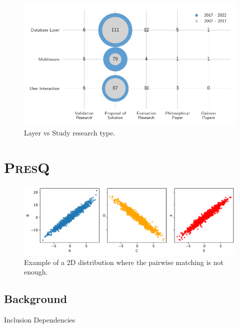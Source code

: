 \documentclass[10pt]{beamer}
\newcommand{\PresQ}[0]{\textsc{PresQ}\xspace}
\begin{document}
\begin{frame}{}
\begin{figure}
    \centering
    \includegraphics[width=\textwidth]{layer_vs_type.pdf}
    \caption{Layer vs Study research type.}
\end{figure}
\end{frame}

\section{\PresQ}

\begin{frame}{}
\begin{figure}
    \centering
    \includegraphics[width=\textwidth]{no2ind.pdf}
    \caption{Example of a 2D distribution where the pairwise matching is not enough.}
\end{figure}
\end{frame}

\subsection{Background}

\begin{frame}{Inclusion Dependencies}
\end{frame}
\end{document}
